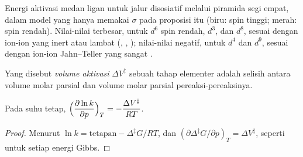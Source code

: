\begin{omfigure}

{\small Energi aktivasi medan ligan untuk jalur disosiatif melalui piramida
segi empat, dalam model yang hanya memakai $\sigma$ pada proposisi itu (biru: spin tinggi;
merah: spin rendah). Nilai-nilai terbesar,
untuk $d^6$ spin rendah, $d^3$, dan $d^8$, sesuai dengan ion-ion yang inert atau lambat (, , );
nilai-nilai negatif, untuk $d^4$ dan $d^9$, sesuai dengan ion-ion Jahn--Teller yang sangat .}
\end{omfigure}

\begin{definition}\label{def:b3:complex-mechanisms:activation-volume}
Yang disebut \emph{volume aktivasi} $\Delta V^{\ddagger}$ sebuah tahap
elementer adalah selisih antara volume molar parsial  dan
volume molar parsial pereaksi-pereaksinya.
\end{definition}

\begin{proposition}\label{prop:b3:complex-mechanisms:pressure}
Pada suhu tetap, $\displaystyle\Bigl(\frac{\partial\ln k}{\partial p}\Bigr)_T = -\frac{\Delta V^{\ddagger}}{RT}$.
\end{proposition}

\begin{proof}
Menurut  $\ln k = \text{tetapan} - \Delta^{\ddagger}G/RT$, dan $(\partial\Delta^{\ddagger}G/\partial p)_T = \Delta V^{\ddagger}$, seperti untuk
setiap energi Gibbs.
\end{proof}

